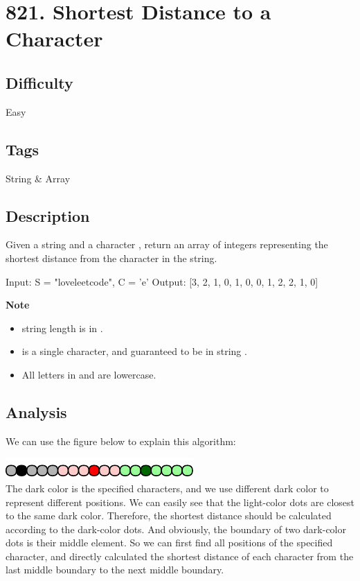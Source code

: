 \tocless\section{821. Shortest Distance to a Character}
\label{algo:821}

\subsection*{Difficulty}
Easy

\subsection*{Tags}
String \& Array

\subsection*{Description}
Given a string  and a character , return an array of integers representing the shortest distance from the character  in the string.

\begin{example}
\begin{multilinecode}
Input: S = "loveleetcode", C = 'e'
Output: [3, 2, 1, 0, 1, 0, 0, 1, 2, 2, 1, 0]
\end{multilinecode}
\end{example}

\textbf{Note}
\begin{itemize}
\item {} string length is in \inlinecode{[1, 10000]}.
\item {} is a single character, and guaranteed to be in string .
\item All letters in  and  are lowercase.
\end{itemize}

\subsection*{Analysis}
We can use the figure below to explain this algorithm:

\includegraphics*{figs/algo_821_1} \\
The dark color is the specified characters, and we use different dark color to represent different positions. We can easily see that the light-color dots are closest to the same dark color. Therefore, the shortest distance should be calculated according to the dark-color dots. And obviously, the boundary of two dark-color dots is their middle element. So we can first find all positions of the specified character, and directly calculated the shortest distance of each character from the last middle boundary to the next middle boundary.

